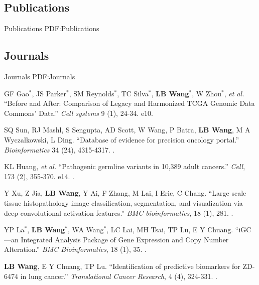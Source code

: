 \documentclass[a4paper,12pt,oneside]{article}
\begin{document}
\begin{body}

\section{Publications}
{Publications}
{PDF:Publications}

\subsection{Journals}
{Journals}
{PDF:Journals}

\begin{publication}[series=pub, widest*=100]

    \item
        GF Gao$^*$, JS Parker$^*$, SM Reynolds$^*$, TC Silva$^*$, \textbf{LB Wang}$^*$, W Zhou$^*$, \textit{et al.}
        ``Before and After: Comparison of Legacy and Harmonized TCGA Genomic Data Commons’ Data.''
        \textit{Cell systems} 9 (1), 24-34. e10.

    \item
        SQ Sun, RJ Mashl, S Sengupta, AD Scott, W Wang, P Batra, \textbf{LB Wang}, M A Wyczalkowski, L Ding.
        ``Database of evidence for precision oncology portal.''
        \textit{Bioinformatics} 34 (24), 4315-4317.
        .

    \item
        KL Huang, \textit {et al.}
        ``Pathogenic germline variants in 10,389 adult cancers.''
        \textit{Cell}, 173 (2), 355-370. e14.
        .

    \item
        Y Xu, Z Jia, \textbf{LB Wang}, Y Ai, F Zhang, M Lai, I Eric, C Chang.
        ``Large scale tissue histopathology image classification, segmentation, and visualization via deep convolutional activation features.''
        \textit{BMC bioinformatics}, 18 (1), 281.
        .

    \item
        YP La$^*$, \textbf{LB Wang}$^*$, WA Wang$^*$, LC Lai, MH Tsai, TP Lu, E Y Chuang.
        ``iGC—an Integrated Analysis Package of Gene Expression and Copy Number Alteration.''
        \textit{BMC Bioinformatics}, 18 (1), 35.
        .

    \item
        \textbf{LB Wang}, E Y Chuang, TP Lu.
        ``Identification of predictive biomarkers for ZD-6474 in lung cancer.''
        \textit{Translational Cancer Research}, 4 (4), 324-331.
        .


\end{publication}
\end{body}
\end{document}
